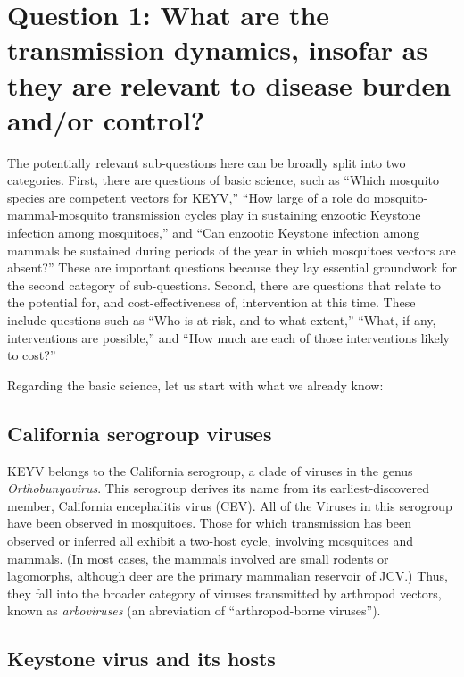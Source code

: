 \documentclass[12pt]{article}
\begin{document}
    \section[Transmission dynamics]{Question 1: What are the transmission dynamics, insofar as they are relevant to disease burden and/or control?}
    \label{transmission-dynamics}
        The potentially relevant sub-questions here can be broadly split into two categories. First, there are questions of basic science, such as ``Which mosquito species are competent vectors for KEYV,'' ``How large of a role do mosquito-mammal-mosquito transmission cycles play in sustaining enzootic Keystone infection among mosquitoes,'' and ``Can enzootic Keystone infection among mammals be sustained during periods of the year in which mosquitoes vectors are absent?'' These are important questions because they lay essential groundwork for the second category of sub-questions. Second, there are questions that relate to the potential for, and cost-effectiveness of, intervention at this time. These include questions such as ``Who is at risk, and to what extent,'' ``What, if any, interventions are possible,'' and ``How much are each of those interventions likely to cost?''

        Regarding the basic science, let us start with what we already know:

        \subsection{California serogroup viruses}
            \label{california-serogroup}
            KEYV belongs to the California serogroup, a clade of viruses in the genus \textit{Orthobunyavirus}. This serogroup derives its name from its earliest-discovered member, California encephalitis virus (CEV). All of the Viruses in this serogroup have been observed in mosquitoes. Those for which transmission has been observed or inferred all exhibit a two-host cycle, involving mosquitoes and mammals. (In most cases, the mammals involved are small rodents or lagomorphs, although deer are the primary mammalian reservoir of JCV.) Thus, they fall into the broader category of viruses transmitted by arthropod vectors, known as \textit{arboviruses} (an abreviation of ``arthropod-borne viruses'').
        
        \subsection{Keystone virus and its hosts}
            \label{california-keystone}
\end{document}
